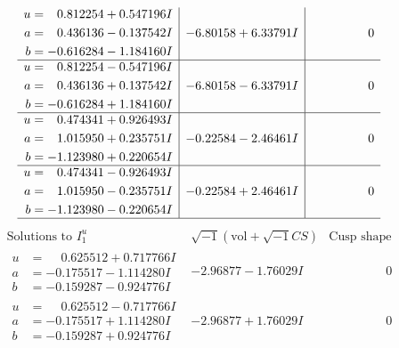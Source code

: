 \documentclass[1p]{elsarticle_modified}
\theoremstyle{definition}
\newcommand{\I}{\sqrt{-1}}
\begin{document}
$$\begin{array}{c|c|c}
\begin{aligned}
u &= \phantom{-}0.812254 + 0.547196 I \\
a &= \phantom{-}0.436136 - 0.137542 I \\
b &= -0.616284 - 1.184160 I\end{aligned}
 & -6.80158 + 6.33791 I & \phantom{-0.000000 } 0 \\ \hline\begin{aligned}
u &= \phantom{-}0.812254 - 0.547196 I \\
a &= \phantom{-}0.436136 + 0.137542 I \\
b &= -0.616284 + 1.184160 I\end{aligned}
 & -6.80158 - 6.33791 I & \phantom{-0.000000 } 0 \\ \hline\begin{aligned}
u &= \phantom{-}0.474341 + 0.926493 I \\
a &= \phantom{-}1.015950 + 0.235751 I \\
b &= -1.123980 + 0.220654 I\end{aligned}
 & -0.22584 - 2.46461 I & \phantom{-0.000000 } 0 \\ \hline\begin{aligned}
u &= \phantom{-}0.474341 - 0.926493 I \\
a &= \phantom{-}1.015950 - 0.235751 I \\
b &= -1.123980 - 0.220654 I\end{aligned}
 & -0.22584 + 2.46461 I & \phantom{-0.000000 } 0\\
 \hline 
 \end{array}$$\newpage$$\begin{array}{c|c|c}  
\text{Solutions to }I^u_{1}& \I (\text{vol} + \sqrt{-1}CS) & \text{Cusp shape}\\
 \hline 
\begin{aligned}
u &= \phantom{-}0.625512 + 0.717766 I \\
a &= -0.175517 - 1.114280 I \\
b &= -0.159287 - 0.924776 I\end{aligned}
 & -2.96877 - 1.76029 I & \phantom{-0.000000 } 0 \\ \hline\begin{aligned}
u &= \phantom{-}0.625512 - 0.717766 I \\
a &= -0.175517 + 1.114280 I \\
b &= -0.159287 + 0.924776 I\end{aligned}
 & -2.96877 + 1.76029 I & \phantom{-0.000000 } 0 \\ \hline\begin{aligned}

\end{aligned}
\end{array}$$
\end{document}
